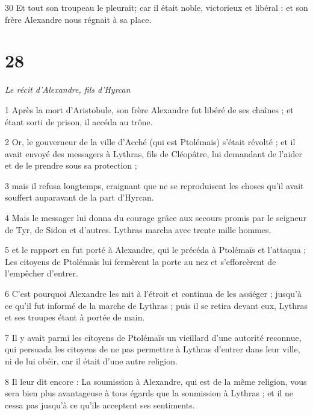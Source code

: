 \par 30 Et tout son troupeau le pleurait; car il était noble, victorieux et libéral : et son frère Alexandre nous régnait à sa place.

\chapter{28}

\par \textit{Le récit d'Alexandre, fils d'Hyrcan}

\par 1 Après la mort d'Aristobule, son frère Alexandre fut libéré de ses chaînes ; et étant sorti de prison, il accéda au trône.

\par 2 Or, le gouverneur de la ville d'Acché (qui est Ptolémaïs) s'était révolté ; et il avait envoyé des messagers à Lythras, fils de Cléopâtre, lui demandant de l'aider et de le prendre sous sa protection ;

\par 3 mais il refusa longtemps, craignant que ne se reproduisent les choses qu'il avait souffert auparavant de la part d'Hyrcan.

\par 4 Mais le messager lui donna du courage grâce aux secours promis par le seigneur de Tyr, de Sidon et d'autres. Lythras marcha avec trente mille hommes.

\par 5 et le rapport en fut porté à Alexandre, qui le précéda à Ptolémaïs et l'attaqua ; Les citoyens de Ptolémaïs lui fermèrent la porte au nez et s'efforcèrent de l'empêcher d'entrer.

\par 6 C'est pourquoi Alexandre les mit à l'étroit et continua de les assiéger ; jusqu'à ce qu'il fut informé de la marche de Lythras ; puis il se retira devant eux, Lythras et ses troupes étant à portée de main.

\par 7 Il y avait parmi les citoyens de Ptolémaïs un vieillard d'une autorité reconnue, qui persuada les citoyens de ne pas permettre à Lythras d'entrer dans leur ville, ni de lui obéir, car il était d'une autre religion.

\par 8 Il leur dit encore : La soumission à Alexandre, qui est de la même religion, vous sera bien plus avantageuse à tous égards que la soumission à Lythras ; et il ne cessa pas jusqu'à ce qu'ils acceptent ses sentiments.

